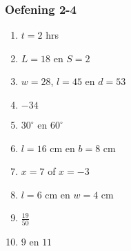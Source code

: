 {\begin{multicols}{3}
\begin{enumerate}[noitemsep, label=\textbf{\arabic*}. ]
\begin{enumerate}[noitemsep, label=\textbf{(\alph*)} ]
\end{enumerate}
\end{enumerate}



\subsubsection*{Oefening 2-4} %

\begin{enumerate}[noitemsep, label=\textbf{\arabic*}. ] 
\item$t = 2$ hrs %
\item $L = 18$ en $S = 2$%
\item $w=28$, $l=45$ en $d=53$%
\item $-34$%
\item$30^{\circ}$ en $60^{\circ}$  %
\item $l=16$ cm en $b=8$ cm%
\item $x = 7$ of $x = -3$%
\item $l = 6$ cm en $w = 4$ cm %
\item$\frac{19}{50}$ %
\item $9$ en $11$ %

\end{enumerate}
\end{multicols}}
